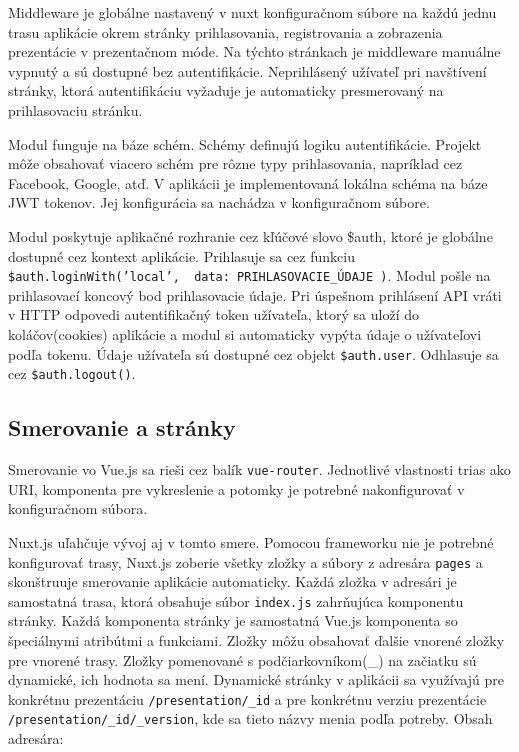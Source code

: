Middleware je globálne nastavený v nuxt konfiguračnom súbore na každú jednu trasu aplikácie okrem stránky prihlasovania, registrovania a zobrazenia prezentácie v prezentačnom móde. Na týchto stránkach je middleware manuálne vypnutý a sú dostupné bez autentifikácie. Neprihlásený užívateľ pri navštívení stránky, ktorá autentifikáciu vyžaduje je automaticky presmerovaný na prihlasovaciu stránku.

Modul funguje na báze schém. Schémy definujú logiku autentifikácie. Projekt môže obsahovať viacero schém pre rôzne typy prihlasovania, napríklad cez Facebook, Google, atď. V aplikácii je implementovaná lokálna schéma na báze JWT tokenov. Jej konfigurácia sa nachádza v konfiguračnom súbore. 

Modul poskytuje aplikačné rozhranie cez kľúčové slovo \$auth, ktoré je globálne dostupné cez kontext aplikácie. Prihlasuje sa cez funkciu \texttt{\$auth.loginWith('local', { data: PRIHLASOVACIE\_ÚDAJE })}. Modul pošle na prihlasovací koncový bod prihlasovacie údaje. Pri úspešnom prihlásení API vráti v HTTP odpovedi autentifikačný token užívateľa, ktorý sa uloží do koláčov(cookies) aplikácie a modul si automaticky vypýta údaje o užívateľovi podľa tokenu. Údaje užívateľa sú dostupné cez objekt \texttt{\$auth.user}. Odhlasuje sa cez \texttt{\$auth.logout()}.

\subsection{Smerovanie a stránky}
Smerovanie vo Vue.js sa rieši cez balík \texttt{vue-router}. Jednotlivé vlastnosti trias ako URI, komponenta pre vykreslenie a  potomky je potrebné nakonfigurovať v konfiguračnom súbora. 

Nuxt.js uľahčuje vývoj aj v tomto smere. Pomocou frameworku nie je potrebné konfigurovať trasy, Nuxt.js zoberie všetky zložky a súbory z adresára \texttt{pages} a skonštruuje smerovanie aplikácie automaticky. Každá zložka v adresári je samostatná trasa, ktorá obsahuje súbor \texttt{index.js} zahrňujúca komponentu stránky. Každá komponenta stránky je samostatná Vue.js komponenta so špeciálnymi atribútmi a funkciami. Zložky môžu obsahovať ďalšie vnorené zložky pre vnorené trasy. Zložky pomenované s podčiarkovníkom(\_) na začiatku sú dynamické, ich hodnota sa mení. Dynamické stránky v aplikácii sa využívajú pre konkrétnu prezentáciu \texttt{/presentation/\_id} a pre konkrétnu verziu prezentácie \texttt{/presentation/\_id/\_version}, kde sa tieto názvy menia podľa potreby. Obsah adresára:

